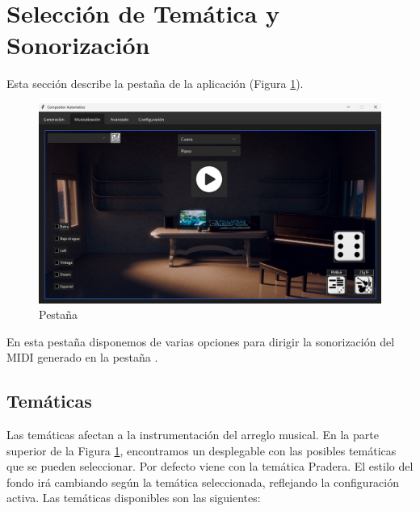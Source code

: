 \section{Selección de Temática y Sonorización}
\label{sec:SeleccionTematica}

Esta sección describe la pestaña \tematicTabName{} de la aplicación (Figura \ref{fig:tematicTab}). 

\begin{figure}[h]
    \begin{center}
        \includegraphics[scale=0.45]{Imagenes/Bitmap/tematicTab.png}
    \end{center}
    \caption{Pestaña \tematicTabName{}}
    \label{fig:tematicTab}
\end{figure}

En esta pestaña disponemos de varias opciones para dirigir la sonorización del MIDI generado en la pestaña .

\subsection{Temáticas}
\label{subsec:app:themes}

Las temáticas afectan a la instrumentación del arreglo musical. En la parte superior de la Figura \ref{fig:tematicTab}, encontramos un desplegable con las posibles temáticas que se pueden seleccionar. Por defecto viene con la temática Pradera. El estilo del fondo irá cambiando según la temática seleccionada, reflejando la configuración activa. 
Las temáticas disponibles son las siguientes:

